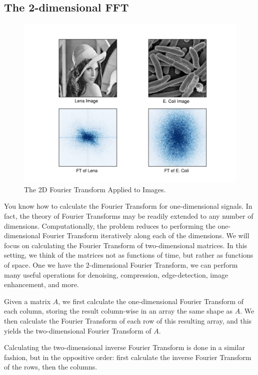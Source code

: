 \subsection*{The 2-dimensional FFT}
\begin{figure}
\centering
\includegraphics[width=\textwidth]{2dfft.pdf}
\caption{The 2D Fourier Transform Applied to Images.}
\label{fourierext:2dfft}
\end{figure}
You know how to calculate the Fourier Transform for one-dimensional signals. In fact, the theory of
Fourier Transforms may be readily extended to any number of dimensions.
Computationally, the problem reduces to performing the one-dimensional Fourier Transform iteratively
along each of the dimensions. We will focus on calculating the Fourier Transform of two-dimensional
matrices. In this setting, we think of the matrices not as functions of time, but rather as functions of
space. One we have the 2-dimensional Fourier Transform, we can perform many useful operations for
denoising, compression, edge-detection, image enhancement, and more.

Given a matrix $A$, we first calculate the one-dimensional Fourier Transform of each column, storing the
result column-wise in an array the same shape as $A$. We then calculate the Fourier Transform of each
row of this resulting array, and this yields the two-dimensional Fourier Transform of $A$. 

Calculating the two-dimensional inverse Fourier Transform is done in a similar fashion, but in the
oppositive order: first calculate the inverse Fourier Transform of the rows, then the columns.

